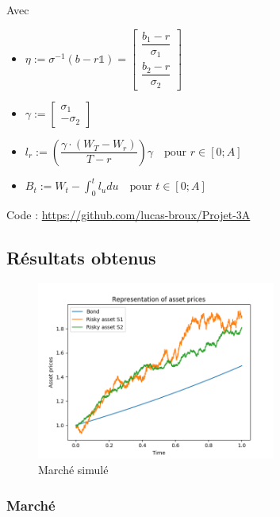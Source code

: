 \documentclass[french]{beamer}
\begin{document}
\begin{frame}
Avec
\begin{itemize}
	\item $\eta := \sigma^{-1} \left( b - r \mathds{1} \right) = \begin{bmatrix} \dfrac{b_{1} - r}{\sigma_{1}} \\ \dfrac{b_{2} - r}{\sigma_{2}} \end{bmatrix}$
	\item $\gamma := \begin{bmatrix} \sigma_{1} \\ - \sigma_{2} \end{bmatrix}$
	\item $l_{r} := \left( \dfrac{\gamma\cdot \left( W_{T} - W_{r} \right)}{T - r} \right) \gamma \quad \text{pour } r \in \left[ 0; A\right]$
	\item $B_{t} := W_{t} - \int_{0}^{t} l_{u} du \quad \text{pour } t \in \left[ 0; A\right]$ \newline
\end{itemize}
Code : \href{https://github.com/lucas-broux/Projet-3A}{https://github.com/lucas-broux/Projet-3A}
\end{frame}


\subsection{Résultats obtenus}
\begin{frame}
\begin{figure}[H]
  \centering
    \includegraphics[width=0.7\textwidth]{images/market.png}
  \caption{Marché simulé}
\end{figure}
\frametitle{Marché}
\end{frame}
\end{document}
